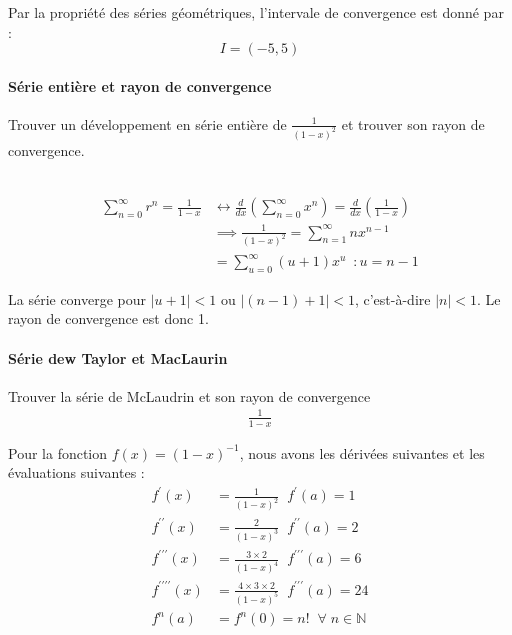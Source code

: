 \documentclass{report}
\begin{document}
\begin{multicols*}{2}
      Par la propriété des séries géométriques, 
      l'intervale de convergence 
      est donné par  :
      \[ I = (-5, 5) \]


      \paragraph{Série entière et rayon de convergence}
      Trouver un développement en série entière de  
      $\frac{1}{(1-x)^2}$ et  trouver son rayon de convergence.

      \mbox{}\\
      \begin{align*}
        \sum_{n=0}^{\infty }r^n =  \frac{1}{1 - x}  
          &\leftrightarrow 
              \frac{d}{dx}\left( \sum_{n=0}^{\infty }x^n\right) 
              = 
              \frac{d}{dx}\left( \frac{1}{1 - x}\right) \\
          &\implies
          \frac{1}{(1 - x)^2} = \sum_{n=1}^{\infty }nx^{n-1} \\ 
          &= 
          \sum_{u=0}^{\infty }(u+1)x^{u}
              \;\ : u = n - 1
      \end{align*}    

      La série converge pour $|u + 1| < 1$ ou $|(n -1) + 1| < 1$, 
      c'est-à-dire $|n| < 1$. Le rayon de convergence est donc 
      1. 


      \paragraph{Série dew Taylor et MacLaurin}
      Trouver la série de McLaudrin et son rayon de convergence 
      \begin{align*}
          \frac{1}{1 - x} 
      \end{align*}

      Pour la fonction $f(x) = (1 - x)^{-1}$, 
      nous avons les dérivées suivantes et les 
      évaluations suivantes : 
      \begin{align*}
        f^{\prime}(x) &= \frac{1}{(1 - x)^2}   
              \;\; f^{\prime}(a) = 1 \\ 
        f^{\prime\prime}(x) &=  \frac{2}{(1 - x)^3}  
          \;\; f^{\prime\prime}(a) = 2 \\
        f^{\prime\prime\prime}(x) &=  \frac{3 \times 2}{(1 - x)^4} 
          \;\; f^{\prime\prime\prime}(a) = 6 \\
        f^{\prime\prime\prime\prime}(x) &=  
              \frac{4 \times 3 \times 2}{(1 - x)^5} 
                  \;\; f^{\prime\prime\prime}(a) = 24 \\
        f^{n}(a) &= f^{n}(0) = n! \;\; \forall \; n \in \mathbb{N}
      \end{align*}


\end{multicols*}
\end{document}
